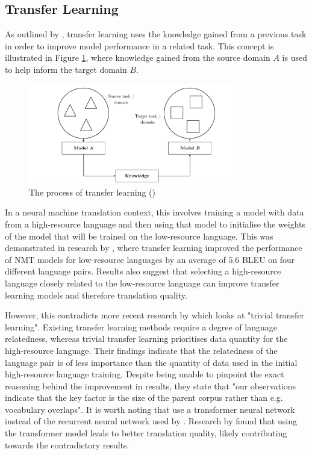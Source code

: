 \subsection{Transfer Learning}
\label{sec:2-transfer_learning}
As outlined by \cite{torrey_transfer_2009}, transfer learning uses the knowledge gained from a previous task in order to improve model performance in a related task. This concept is illustrated in Figure \ref{fig:transfer}, where knowledge gained from the source domain $A$ is used to help inform the target domain $B$.

\begin{figure}[ht!]
\centering
\includegraphics[width=0.8\textwidth]{media/literature/nmt_approaches/transfer.png}
\caption[Diagram of the transfer learning process]{The process of transfer learning (\cite{ruder_transfer_2019})}
\label{fig:transfer}
\end{figure}


In a neural machine translation context, this involves training a model with data from a high-resource language and then using that model to initialise the weights of the model that will be trained on the low-resource language.
This was demonstrated in research by \cite{zoph_transfer_2016}, where transfer learning improved the performance of \acrshort{NMT} models for low-resource languages by an average of $5.6$ \acrshort{BLEU} on four different language pairs. Results also suggest that selecting a high-resource language closely related to the low-resource language can improve transfer learning models and therefore translation quality.

However, this contradicts more recent research by \cite{kocmi_trivial_2018} which looks at "trivial transfer learning". Existing transfer learning methods require a degree of language relatedness, whereas trivial transfer learning prioritises data quantity for the high-resource language. Their findings indicate that the relatedness of the language pair is of less importance than the quantity of data used in the initial high-resource language training. Despite being unable to pinpoint the exact reasoning behind the improvement in results, they state that "our observations indicate that the key factor is the size of the parent corpus rather than e.g. vocabulary overlaps".
It is worth noting that \cite{kocmi_trivial_2018} use a transformer neural network instead of the recurrent neural network used by \cite{zoph_transfer_2016}. Research by \cite{popel_training_2018} found that using the transformer model leads to better translation quality, likely contributing towards the contradictory results.


